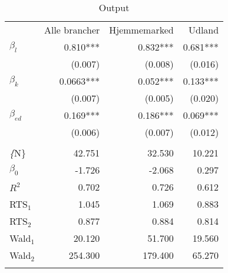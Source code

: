 \begin{table}[tb]
\centering
\caption{Output}
\label{tab:OutputAlleUdeHjemme}
\begin{tabular}{@{}lrrr@{}}
\arrayrulecolor{MidnightBlue}\toprule
             & Alle brancher & Hjemmemarked & Udland   \\
             \arrayrulecolor{MidnightBlue}\midrule
$\beta_l$    & 0.810***      & 0.832***     & 0.681*** \\
             & (0.007)       & (0.008)      & (0.016)  \\
$\beta_k$    & 0.0663***     & 0.052***     & 0.133*** \\
             & (0.007)       & (0.005)      & (0.020)  \\
$\beta_{ed}$ & 0.169***      & 0.186***     & 0.069*** \\
             & (0.006)       & (0.007)      & (0.012)  \\
             &               &              &          \\
\emph\{N\}   & 42.751        & 32.530       & 10.221   \\
$\beta_0$    & -1.726        & -2.068       & 0.297    \\
$R^2$        & 0.702         & 0.726        & 0.612    \\
RTS$_1$      & 1.045         & 1.069        & 0.883    \\
RTS$_2$      & 0.877         & 0.884        & 0.814    \\
Wald$_1$     & 20.120        & 51.700       & 19.560   \\
Wald$_2$     & 254.300       & 179.400      & 65.270  \\
\arrayrulecolor{MidnightBlue}\bottomrule 
\end{tabular}
\end{table}